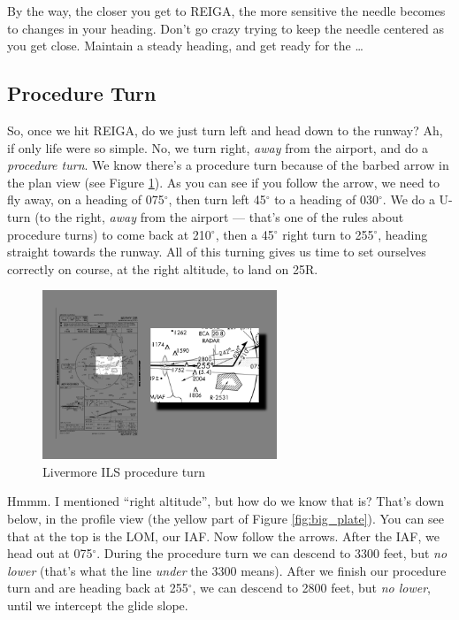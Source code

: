 By the way, the closer you get to REIGA, the more sensitive the needle
becomes to changes in your heading.  Don't go crazy trying to keep the
needle centered as you get close.  Maintain a steady heading, and get
ready for the \ldots{}

\subsection{Procedure Turn}

So, once we hit REIGA, do we just turn left and head down to the
runway?  Ah, if only life were so simple.  No, we turn right,
\emph{away} from the airport, and do a \emph{procedure turn}.  We know
there's a procedure turn because of the barbed arrow in the plan view
(see Figure \ref{fig:PT}).  As you can see if you follow the arrow, we
need to fly away, on a heading of 075$^\circ$, then turn left
45$^\circ$ to a heading of 030$^\circ$.  We do a U-turn (to the right,
\emph{away} from the airport --- that's one of the rules about
procedure turns) to come back at 210$^\circ$, then a 45$^\circ$ right
turn to 255$^\circ$, heading straight towards the runway.  All of this
turning gives us time to set ourselves correctly on course, at the
right altitude, to land on 25R.

\begin{figure}
  \begin{center}
    \includegraphics[width=7cm]{img/PT.png}
    \caption{Livermore ILS procedure turn}
    \label{fig:PT}
  \end{center}
\end{figure}

Hmmm.  I mentioned ``right altitude'', but how do we know that is?
That's down below, in the profile view (the yellow part of Figure
\ref{fig:big_plate}).  You can see that at the top is the LOM, our
IAF.  Now follow the arrows.  After the IAF, we head out at
075$^\circ$.  During the procedure turn we can descend to 3300 feet,
but \emph{no lower} (that's what the line \emph{under} the 3300
means).  After we finish our procedure turn and are heading back at
255$^\circ$, we can descend to 2800 feet, but \emph{no lower}, until
we intercept the glide slope.

